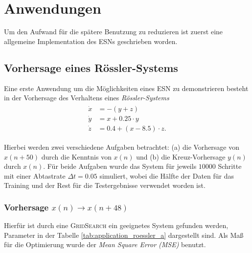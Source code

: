 \chapter{Anwendungen}
Um den Aufwand für die spätere Benutzung zu reduzieren ist zuerst eine allgemeine Implementation des \textsc{ESN}s geschrieben worden. 

\section{Vorhersage eines Rössler-Systems}
Eine erste Anwendung um die Möglichkeiten eines \textsc{ESN} zu demonstrieren besteht in der Vorhersage des Verhaltens eines \textit{Rössler-Systems}
\begin{align}
\label{eq:application_roessler_pde}
\begin{split}
\dot{x} &= -(y+z)\\
\dot{y} &= x + 0.25 \cdot  y\\
\dot{z} &= 0.4 + (x - 8.5)\cdot z.
\end{split}
\end{align}

Hierbei werden zwei verschiedene Aufgaben betrachtet: (a) die Vorhersage von $x(n+50)$ durch die Kenntnis von $x(n)$ und (b) die Kreuz-Vorhersage $y(n)$ durch $x(n)$. Für beide Aufgaben wurde das System für jeweils $10000$ Schritte mit einer Abtastrate $\Delta t = 0.05$ simuliert, wobei die Hälfte der Daten für das Training und der Rest für die Testergebnisse verwendet worden ist.

\subsection{Vorhersage $x(n) \rightarrow x(n+48)$}
Hierfür ist durch eine \textsc{GridSearch} ein geeignetes System gefunden werden, Parameter in der Tabelle \ref{tab:application_roessler_a} dargestellt sind. Als Maß für die Optimierung wurde der \textit{Mean Square Error (MSE)} benutzt. 

